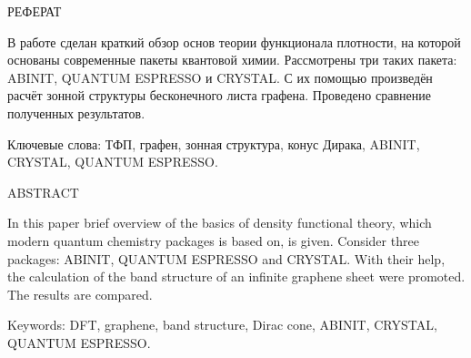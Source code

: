\begin{center}
    РЕФЕРАТ
\end{center}

В работе сделан краткий обзор основ теории функционала плотности, на которой основаны современные пакеты квантовой химии. Рассмотрены три таких пакета: ABINIT, QUANTUM ESPRESSO и CRYSTAL. С их помощью произведён расчёт зонной структуры бесконечного листа графена. Проведено сравнение полученных результатов.

\vspace{1cm}
Ключевые слова: ТФП, графен, зонная структура, конус Дирака, ABINIT, CRYSTAL, QUANTUM ESPRESSO.

\vspace{2cm}
\begin{center}
    ABSTRACT
\end{center}

In this paper brief overview of the basics of density functional theory, which  modern quantum chemistry packages is based on, is given. Consider three packages: ABINIT, QUANTUM ESPRESSO and CRYSTAL. With their help, the calculation of the band structure of an infinite graphene sheet were promoted. The results are compared.

\vspace{1cm}
Keywords: DFT, graphene, band structure, Dirac cone, ABINIT, CRYSTAL, QUANTUM ESPRESSO.